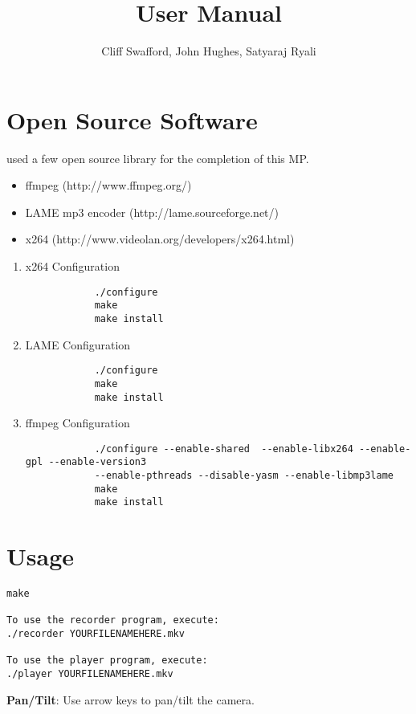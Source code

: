 \documentclass[a4paper]{article}
\title{User Manual}
\begin{document}
\author{ Cliff Swafford, John Hughes, Satyaraj Ryali}
\maketitle

\section{Open Source Software}
\begin{description}
	\item used a few open source library for the completion of this MP.
\end{description}
\begin{itemize}
	\item ffmpeg (http://www.ffmpeg.org/)
	\item LAME mp3 encoder (http://lame.sourceforge.net/)
	\item x264 (http://www.videolan.org/developers/x264.html)
\end{itemize}

\begin{enumerate}
	\item x264 Configuration
		\begin{verbatim}
			./configure
			make
			make install
		\end{verbatim}

	\item LAME Configuration
		\begin{verbatim}
			./configure
			make
			make install
		\end{verbatim}

	\item ffmpeg Configuration
		\begin{verbatim}
			./configure --enable-shared  --enable-libx264 --enable-gpl --enable-version3  
			--enable-pthreads --disable-yasm --enable-libmp3lame
			make
			make install
		\end{verbatim}
\end{enumerate}

\section{Usage}
\begin{verbatim}
make

To use the recorder program, execute:
./recorder YOURFILENAMEHERE.mkv

To use the player program, execute:
./player YOURFILENAMEHERE.mkv
\end{verbatim}
 \textbf{Pan/Tilt}: Use arrow keys to pan/tilt the camera.
\end{document}
